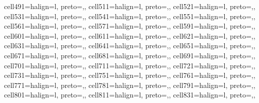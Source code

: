 \begin{table}
\begin{talltblr}[         %
caption={Technology Adoption Models:  Germany},
note{}={* p \num{< 0.1}, ** p \num{< 0.05}, *** p \num{< 0.01}},
note{ }={* p < 0.1, ** p < 0.05, *** p < 0.01},
]
{cell{49}{1}={}{halign=l, preto={\hspace{1em}},},
cell{51}{1}={}{halign=l, preto={\hspace{1em}},},
cell{52}{1}={}{halign=l, preto={\hspace{1em}},},
cell{53}{1}={}{halign=l, preto={\hspace{1em}},},
cell{54}{1}={}{halign=l, preto={\hspace{1em}},},
cell{55}{1}={}{halign=l, preto={\hspace{1em}},},
cell{56}{1}={}{halign=l, preto={\hspace{1em}},},
cell{57}{1}={}{halign=l, preto={\hspace{1em}},},
cell{59}{1}={}{halign=l, preto={\hspace{1em}},},
cell{60}{1}={}{halign=l, preto={\hspace{1em}},},
cell{61}{1}={}{halign=l, preto={\hspace{1em}},},
cell{62}{1}={}{halign=l, preto={\hspace{1em}},},
cell{63}{1}={}{halign=l, preto={\hspace{1em}},},
cell{64}{1}={}{halign=l, preto={\hspace{1em}},},
cell{65}{1}={}{halign=l, preto={\hspace{1em}},},
cell{67}{1}={}{halign=l, preto={\hspace{1em}},},
cell{68}{1}={}{halign=l, preto={\hspace{1em}},},
cell{69}{1}={}{halign=l, preto={\hspace{1em}},},
cell{70}{1}={}{halign=l, preto={\hspace{1em}},},
cell{71}{1}={}{halign=l, preto={\hspace{1em}},},
cell{72}{1}={}{halign=l, preto={\hspace{1em}},},
cell{73}{1}={}{halign=l, preto={\hspace{1em}},},
cell{75}{1}={}{halign=l, preto={\hspace{1em}},},
cell{76}{1}={}{halign=l, preto={\hspace{1em}},},
cell{77}{1}={}{halign=l, preto={\hspace{1em}},},
cell{78}{1}={}{halign=l, preto={\hspace{1em}},},
cell{79}{1}={}{halign=l, preto={\hspace{1em}},},
cell{80}{1}={}{halign=l, preto={\hspace{1em}},},
cell{81}{1}={}{halign=l, preto={\hspace{1em}},},
cell{83}{1}={}{halign=l, preto={\hspace{1em}},},
}
\end{talltblr}
\end{table}
